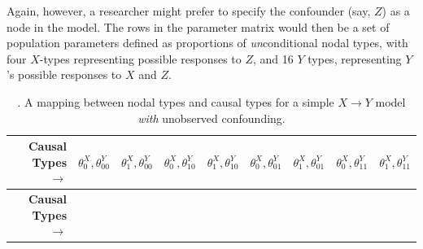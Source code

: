 \documentclass[12pt,]{book}
\begin{document}
Again, however, a researcher might prefer to specify the confounder (say, \(Z\)) as a node in the model. The rows in the parameter matrix would then be a set of population parameters defined as proportions of \emph{un}conditional nodal types, with four \(X\)-types representing possible responses to \(Z\), and 16 \(Y\) types, representing \(Y\)'s possible responses to \(X\) and \(Z\).

\begin{longtable}[]{@{}rcccccccc@{}}
\caption{\label{tab:parammmatrixconf}. A mapping between nodal types and causal types for a simple \(X \rightarrow Y\) model \emph{with} unobserved confounding.}\tabularnewline
\toprule
\begin{minipage}[b]{0.12\columnwidth}\raggedleft
\textbf{Causal Types \(\rightarrow\)}\strut
\end{minipage} & \begin{minipage}[b]{0.08\columnwidth}\centering
\(\theta^X_0,\theta^Y_{00}\)\strut
\end{minipage} & \begin{minipage}[b]{0.08\columnwidth}\centering
\(\theta^X_1,\theta^Y_{00}\)\strut
\end{minipage} & \begin{minipage}[b]{0.08\columnwidth}\centering
\(\theta^X_0,\theta^Y_{10}\)\strut
\end{minipage} & \begin{minipage}[b]{0.08\columnwidth}\centering
\(\theta^X_1,\theta^Y_{10}\)\strut
\end{minipage} & \begin{minipage}[b]{0.08\columnwidth}\centering
\(\theta^X_0,\theta^Y_{01}\)\strut
\end{minipage} & \begin{minipage}[b]{0.08\columnwidth}\centering
\(\theta^X_1,\theta^Y_{01}\)\strut
\end{minipage} & \begin{minipage}[b]{0.08\columnwidth}\centering
\(\theta^X_0,\theta^Y_{11}\)\strut
\end{minipage} & \begin{minipage}[b]{0.08\columnwidth}\centering
\(\theta^X_1,\theta^Y_{11}\)\strut
\end{minipage}\tabularnewline
\midrule
\endfirsthead
\toprule
\begin{minipage}[b]{0.12\columnwidth}\raggedleft
\textbf{Causal Types \(\rightarrow\)}\strut
\end{minipage} & \begin{minipage}[b]{0.08\columnwidth}\centering

\end{minipage}
\end{longtable}
\end{document}

